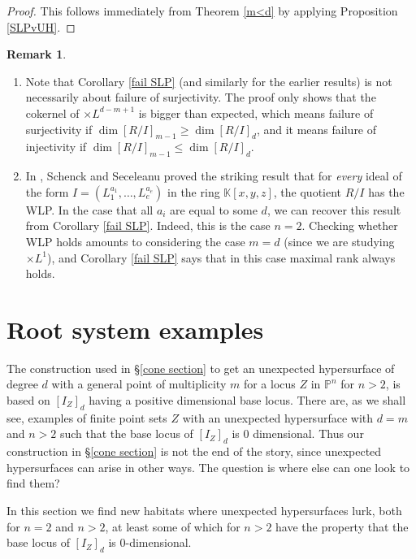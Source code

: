 \documentclass[12pt]{amsart}
\numberwithin{equation}{section}
\theoremstyle{definition}
\newtheorem{remark}[theorem]{Remark}
\newcommand{\PP}{ \ensuremath{\mathbb{P}}}
\newcommand{\KK}{ \ensuremath{\mathbb{K}}}
\begin{document}
\begin{proof}
This follows immediately from Theorem \ref{m<d} by applying Proposition \ref{SLPvUH}.
\end{proof}

\begin{remark}
\begin{enumerate}
\item Note that Corollary \ref{fail SLP} (and similarly for the earlier results) is not necessarily about failure of surjectivity. The proof only 
shows that the cokernel of $\times L^{d-m+1}$ is bigger than expected, which means failure of surjectivity if $\dim [R/I]_{m-1} \geq \dim [R/I]_d$, and it means failure of injectivity if $\dim [R/I]_{m-1} \leq \dim [R/I]_d$.

\item In \cite{SS}, Schenck and Seceleanu proved the striking result that for {\em every} ideal of the form $I = (L_1^{a_1},\dots,L_e^{a_e})$ in the ring $\KK[x,y,z]$, the quotient $R/I$ has the WLP. In the case that all $a_i$ are equal to some $d$, we can recover this result from Corollary \ref{fail SLP}. Indeed, this is the case $n=2$. Checking whether WLP holds amounts to considering the case $m=d$ (since we are studying $\times L^1$), and Corollary \ref{fail SLP} says that in this case maximal rank always holds.

\end{enumerate}
\end{remark}




\section{Root system examples} \label{root system section}

The construction used in \S \ref{cone section}  
to get an unexpected hypersurface of degree $d$ with a general point of multiplicity $m$
for a locus $Z$ in $\PP^n$ for $n>2$, is based on $[I_Z]_d$ having a positive dimensional base locus.
There are, as we shall see, examples of finite point sets $Z$ with an unexpected hypersurface 
with $d=m$ and $n>2$ such that the base locus of $[I_Z]_d$ is 0 dimensional. Thus our construction
in \S \ref{cone section} is not the end of the story, since unexpected hypersurfaces
can arise in other ways. The question is where else can one look to find them?

In this section we find new habitats where unexpected hypersurfaces lurk, 
both for $n=2$ and $n>2$, at least some of which for $n>2$
have the property that the base locus of $[I_Z]_d$ is 0-dimensional.
\end{document}
